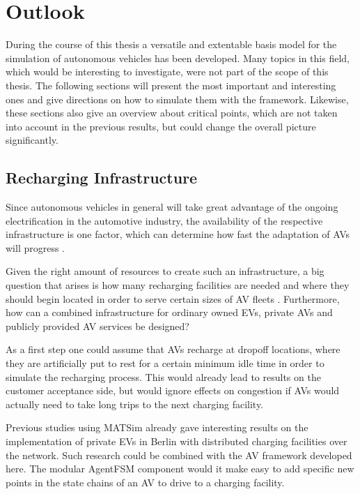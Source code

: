 \section{Outlook}

During the course of this thesis a versatile and extentable basis model for the
simulation of autonomous vehicles has been developed. Many topics in this field,
which would be interesting to investigate, were not part of the scope of this thesis.
The following sections will present the most important and interesting ones and
give directions on how to simulate them with the framework. Likewise, these sections
also give an overview about critical points, which are not taken into account in
the previous results, but could change the overall picture significantly.

\subsection{Recharging Infrastructure}

Since autonomous vehicles in general will take great advantage of the ongoing
electrification in the automotive industry, the availability of the respective
infrastructure is one factor, which can determine how fast the adaptation of AVs
will progress .

Given the right amount of resources to create such an infrastructure, a big question
that arises is how many recharging facilities are needed and where they should begin
located in order to serve certain sizes of AV fleets \citep{Chen2015}. Furthermore, how can a combined
infrastructure for ordinary owned EVs, private AVs and publicly provided AV services
be designed?

As a first step one could assume that AVs recharge at dropoff locations, where they
are artificially put to rest for a certain minimum idle time in order to simulate
the recharging process. This would already lead to results on the customer acceptance
side, but would ignore effects on congestion if AVs would actually need to take long
trips to the next charging facility.

Previous studies using MATSim already gave interesting results on the implementation
of private EVs  in Berlin with distributed charging facilities
over the network. Such research could be combined with the AV framework developed here.
The modular AgentFSM component would it make easy to add specific new points in the
state chains of an AV to drive to a charging facility.

